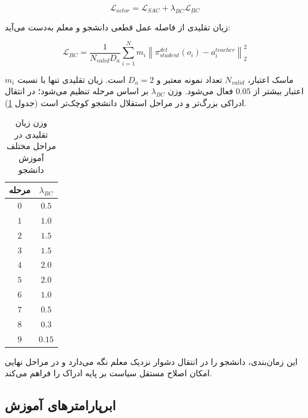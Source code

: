 \begin{equation}
	\mathcal{L}_{actor}=
	\mathcal{L}_{SAC}+\lambda_{BC}\mathcal{L}_{BC}
	\label{eq:distilled_actor_loss_final}
\end{equation}

زیان تقلیدی از فاصله عمل قطعی دانشجو و معلم به‌دست می‌آید:

\begin{equation}
	\mathcal{L}_{BC}=
	\frac{1}{N_{valid}D_a}
	\sum_{i=1}^{N}
	m_i
	\left\|
	\pi^{det}_{student}(o_i)-a^{teacher}_i
	\right\|_2^2
	\label{eq:bc_loss_final}
\end{equation}

\(m_i\) ماسک اعتبار، \(N_{valid}\) تعداد نمونه معتبر و \(D_a=2\) است. زیان تقلیدی تنها با نسبت اعتبار بیشتر از \(0.05\) فعال می‌شود. وزن \(\lambda_{BC}\) بر اساس مرحله تنظیم می‌شود؛ در انتقال ادراکی بزرگ‌تر و در مراحل استقلال دانشجو کوچک‌تر است (جدول \ref{tab:bc_weight_by_stage_final}).

\begin{table}[htbp]
	\centering
	\caption{وزن زیان تقلیدی در مراحل مختلف آموزش دانشجو}
	\label{tab:bc_weight_by_stage_final}
	\begin{tabular}{|c|c|}
		\hline
		\textbf{مرحله} & \(\lambda_{BC}\) \\
		\hline
		$0$ & $0.5$ \\
		\hline
		$1$ & $1.0$ \\
		\hline
		$2$ & $1.5$ \\
		\hline
		$3$ & $1.5$ \\
		\hline
		$4$ & $2.0$ \\
		\hline
		$5$ & $2.0$ \\
		\hline
		$6$ & $1.0$ \\
		\hline
		$7$ & $0.5$ \\
		\hline
		$8$ & $0.3$ \\
		\hline
		$9$ & $0.15$ \\
		\hline
	\end{tabular}
\end{table}

این زمان‌بندی، دانشجو را در انتقال دشوار نزدیک معلم نگه می‌دارد و در مراحل نهایی امکان اصلاح مستقل سیاست بر پایه ادراک را فراهم می‌کند.

\subsection{ابرپارامترهای آموزش}
\label{subsec:training_hyperparameters_final}

